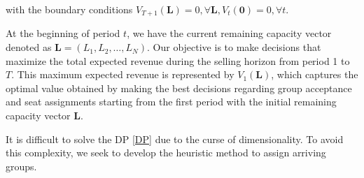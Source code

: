 with the boundary conditions $V_{T+1}(\mathbf{L}) = 0, \forall \mathbf{L}, V_{t}(\mathbf{0}) =0, \forall t$.

At the beginning of period $t$, we have the current remaining capacity vector denoted as $\mathbf{L} = (L_1, L_2, \ldots, L_N)$. Our objective is to make decisions that maximize the total expected revenue during the selling horizon from period 1 to $T$. This maximum expected revenue is represented by $V_1(\mathbf{L})$, which captures the optimal value obtained by making the best decisions regarding group acceptance and seat assignments starting from the first period with the initial remaining capacity vector $\mathbf{L}$.

It is difficult to solve the DP \eqref{DP} due to the curse of dimensionality. To avoid this complexity, we seek to develop the heuristic method to assign arriving groups.





